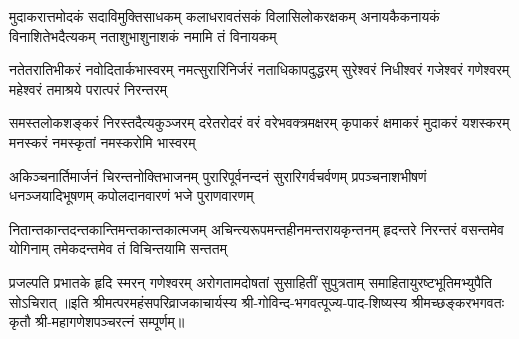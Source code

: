 
\fourlineindentedshloka
{मुदाकरात्तमोदकं सदाविमुक्तिसाधकम्}
{कलाधरावतंसकं विलासिलोकरक्षकम्}
{अनायकैकनायकं विनाशितेभदैत्यकम्}
{नताशुभाशुनाशकं नमामि तं विनायकम्}

\fourlineindentedshloka
{नतेतरातिभीकरं नवोदितार्कभास्वरम्}
{नमत्सुरारिनिर्जरं नताधिकापदुद्धरम्}
{सुरेश्वरं निधीश्वरं गजेश्वरं गणेश्वरम्}
{महेश्वरं तमाश्रये परात्परं निरन्तरम्}

\fourlineindentedshloka
{समस्तलोकशङ्करं निरस्तदैत्यकुञ्जरम्}
{दरेतरोदरं वरं वरेभवक्त्रमक्षरम्}
{कृपाकरं क्षमाकरं मुदाकरं यशस्करम्}
{मनस्करं नमस्कृतां नमस्करोमि भास्वरम्}

\fourlineindentedshloka
{अकिञ्चनार्तिमार्जनं चिरन्तनोक्तिभाजनम्}
{पुरारिपूर्वनन्दनं सुरारिगर्वचर्वणम्}
{प्रपञ्चनाशभीषणं धनञ्जयादिभूषणम्}
{कपोलदानवारणं भजे पुराणवारणम्}

\fourlineindentedshloka
{नितान्तकान्तदन्तकान्तिमन्तकान्तकात्मजम्}
{अचिन्त्यरूपमन्तहीनमन्तरायकृन्तनम्}
{हृदन्तरे निरन्तरं वसन्तमेव योगिनाम्}
{तमेकदन्तमेव तं विचिन्तयामि सन्ततम्}

{प्रजल्पति प्रभातके हृदि स्मरन् गणेश्वरम्}
{अरोगतामदोषतां सुसाहितीं सुपुत्रताम्}
{समाहितायुरष्टभूतिमभ्युपैति सोऽचिरात्}
॥इति श्रीमत्परमहंसपरिव्राजकाचार्यस्य श्री-गोविन्द-भगवत्पूज्य-पाद-शिष्यस्य
श्रीमच्छङ्करभगवतः कृतौ श्री-महागणेशपञ्चरत्नं सम्पूर्णम्॥
